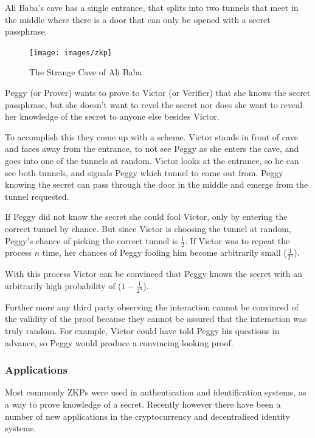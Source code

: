 \bigskip

Ali Baba's cave has a single entrance, that splits into two tunnels that meet in the middle where there is a door that can only be opened with a secret passphrase.

\begin{figure}[h]
	\centering
	\texttt{[image: images/zkp]}
	\caption{The Strange Cave of Ali Baba}
	\label{fig:strange-cave-of-alibaba}
\end{figure}


\bigskip

Peggy (or Prover) wants to prove to Victor (or Verifier) that she knows the secret passphrase, but she doesn't want to revel the secret nor does she want to reveal her knowledge of the secret to anyone else besides Victor.

\bigskip

To accomplish this they come up with a scheme.
Victor stands in front of cave and faces away from the entrance, to not see Peggy as she enters the cave, and goes into one of the tunnels at random.
Victor looks at the entrance, so he can see both tunnels, and signals Peggy which tunnel to come out from.
Peggy knowing the secret can pass through the door in the middle and emerge from the tunnel requested.

\bigskip

If Peggy did not know the secret she could fool Victor, only by entering the correct tunnel by chance.
But since Victor is choosing the tunnel at random, Peggy's chance of picking the correct tunnel is $\frac{1}{2}$. If Victor was to repeat the process $n$ time, her chances of Peggy fooling him become arbitrarily small ($\frac{1}{2^n}$).

With this process Victor can be convinced that Peggy knows the secret with an arbitrarily high probability of ($1 - \frac{1}{2^n}$).

\bigskip

Further more any third party observing the interaction cannot be convinced of the validity of the proof because they cannot be assured that the interaction was truly random. 
For example, Victor could have told Peggy his questions in advance, so Peggy would produce a convincing looking proof.

\subsubsection{Applications}
Most commonly ZKPs were used in authentication and identification systems, as a way to prove knowledge of a secret. 
Recently however there have been a number of new applications in the cryptocurrency and decentralised identity systems.

